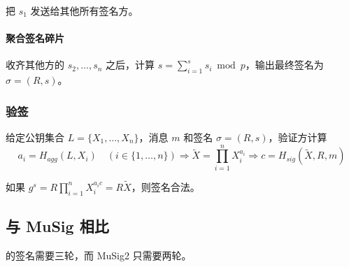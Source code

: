 \documentclass[a4paper,10pt]{article}
\begin{document}
把 \(s_1\) 发送给其他所有签名方。

\paragraph{聚合签名碎片} 收齐其他方的 \(s_2,\dots,s_n\) 之后，计算 \(s=\sum_{i=1}^s s_i\bmod p\)，输出最终签名为 \(\sigma=(R,s)\)。

\subsubsection{验签}
给定公钥集合 \(L=\{X_1,\dots,X_n\}\)，消息 \(m\) 和签名 \(\sigma=(R,s)\)，验证方计算
\[
  a_i=H_{agg}(L,X_i) \quad (i\in\{1,\dots,n\}) \Rightarrow \tilde{X}=\prod_{i=1}^n X_i^{a_i} \Rightarrow c=H_{sig}(\tilde{X},R,m)
\]
 
如果 \(g^s=R\prod_{i=1}^n X_i^{a_i c}=R\tilde{X}\)，则签名合法。

\subsection{与 MuSig 相比}
\cite{cryptoeprint:2018:068} 的签名需要三轮，而 MuSig2 只需要两轮。



\end{document}
